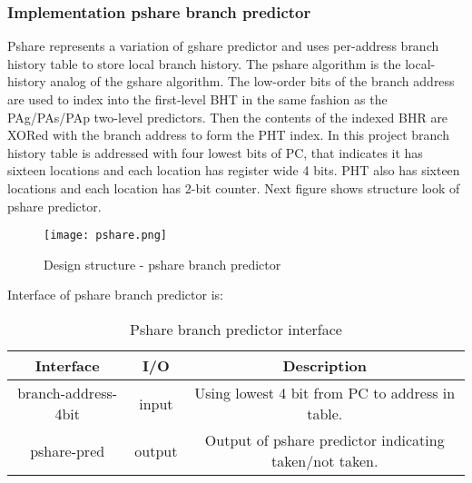 \documentclass{scrreprt}
\begin{document}
\subsubsection*{Implementation pshare branch predictor}
Pshare represents a variation of gshare predictor and uses per-address branch history table to store local branch history. The pshare algorithm is the local-history analog of the gshare algorithm. The low-order bits of the branch address are used to index into the first-level BHT in the same fashion as the PAg/PAs/PAp two-level predictors. Then the contents of the indexed BHR are XORed with the branch address to form the PHT index.
In this project branch history table is addressed with four lowest bits of PC, that indicates it has sixteen locations and each location has register wide 4 bits. PHT also has sixteen locations and each location has 2-bit counter. Next figure shows structure look of pshare predictor. 
\begin{figure}[htb!]
    \centering
    \texttt{[image: pshare.png]}
    \caption{Design structure - pshare branch predictor}
    \label{fig:pshare}
\end{figure}
\newline
\newline
\newline
\newline
\newline
\newline
\newline
Interface of pshare branch predictor is:
\begin{table}[htb!]
            \centering
            \begin{tabular}{|c|c|c|} \hline 
             Interface & I/O & Description \\ \hline  
             branch-address-4bit & input & Using lowest 4 bit from PC to address in table. \\ \hline  
             pshare-pred & output & Output of pshare predictor indicating taken/not taken.  \\ \hline
        \end{tabular}
        \caption{Pshare branch predictor interface}
        \label{tab:pshareI}
    \end{table}

\end{document}
